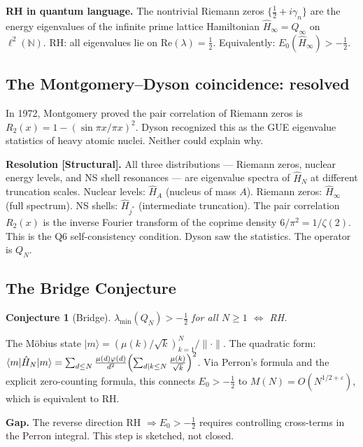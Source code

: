 \documentclass[12pt]{article}
\newtheorem{conjecture}[theorem]{Conjecture}
\newcommand{\ket}[1]{|{#1}\rangle}
\newcommand{\bra}[1]{\langle{#1}|}
\newcommand{\half}{\tfrac{1}{2}}
\begin{document}
\begin{tcolorbox}[qbox]
\textbf{RH in quantum language.}
The nontrivial Riemann zeros $\{\half+i\gamma_n\}$ are the energy
eigenvalues of the infinite prime lattice Hamiltonian
$\hat{H}_\infty = Q_\infty$ on $\ell^2(\mathbb{N})$.
RH: all eigenvalues lie on $\mathrm{Re}(\lambda) = \half$.
Equivalently: $E_0(\hat{H}_\infty) > -\half$.
\end{tcolorbox}

\subsection{The Montgomery--Dyson coincidence: resolved}

In 1972, Montgomery proved the pair correlation of Riemann zeros is
$R_2(x) = 1 - (\sin\pi x/\pi x)^2$.
Dyson recognized this as the GUE eigenvalue statistics of heavy
atomic nuclei.
Neither could explain why.

\begin{tcolorbox}[provedbox]
\textbf{Resolution [Structural].}
All three distributions --- Riemann zeros, nuclear energy levels,
and NS shell resonances --- are eigenvalue spectra of $\hat{H}_N$
at different truncation scales.
Nuclear levels: $\hat{H}_A$ (nucleus of mass $A$).
Riemann zeros: $\hat{H}_\infty$ (full spectrum).
NS shells: $\hat{H}_{j^*}$ (intermediate truncation).
The pair correlation $R_2(x)$ is the inverse Fourier transform
of the coprime density $6/\pi^2 = 1/\zeta(2)$.
This is the Q6 self-consistency condition.
Dyson saw the statistics. The operator is $Q_N$.
\end{tcolorbox}

\subsection{The Bridge Conjecture}

\begin{conjecture}[Bridge]
$\lambda_{\min}(Q_N) > -\half$ for all $N \ge 1$
$\Longleftrightarrow$ RH.
\end{conjecture}

The M\"{o}bius state $\ket{m} = (\mu(k)/\sqrt{k})_{k=1}^N / \|\cdot\|$.
The quadratic form:
$\bra{m}\hat{H}_N\ket{m}
= \sum_{d\le N}\frac{\mu(d)\varphi(d)}{d^2}
  \Bigl(\sum_{d|k\le N}\frac{\mu(k)}{\sqrt{k}}\Bigr)^2$.
Via Perron's formula and the explicit zero-counting formula,
this connects $E_0 > -\half$ to $M(N) = O(N^{1/2+\varepsilon})$,
which is equivalent to RH.

\begin{tcolorbox}[warnbox]
\textbf{Gap.} The reverse direction RH $\Rightarrow E_0 > -\half$
requires controlling cross-terms in the Perron integral.
This step is sketched, not closed.
\end{tcolorbox}
\end{document}
